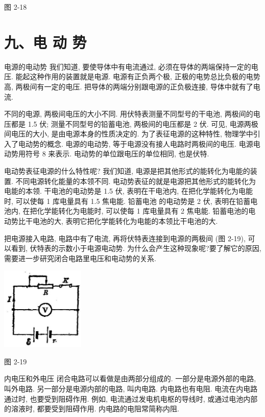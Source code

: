 \documentclass[10pt]{article}
\begin{document}
图 2-18

\section*{九、电 动 势}

电源的电动势 我们知道, 要使导体中有电流通过, 必须在导体的两端保持一定的电压. 能起这种作用的装置就是电源. 电源有正负两个极, 正极的电势总比负极的电势高, 两极间有一定的电压. 把导体的两端分别跟电源的正负极连接, 导体中就有了电流.

不同的电源, 两极间电压的大小不同. 用伏特表测量不同型号的干电池, 两极间的电压都是 1.5 伏; 测量不同型号的铅蓄电池, 两极间的电压都是 2 伏. 可见, 电源两极间电压的大小, 是由电源本身的性质决定的. 为了表征电源的这种特性, 物理学中引入了电动势的概念. 电源的电动势, 等于电源没有接人电路时两极间的电压. 电源电动势用符号 8 来表示. 电动势的单位跟电压的单位相同, 也是伏特.

电动势表征电源的什么特性呢? 我们知道, 电源是把其他形式的能转化为电能的装置. 不同电源转化能量的本领不同. 电动势表征的就是电源把其他形式的能转化为电能的本领. 干电池的电动势是 1.5 伏, 表明在干电池内, 在把化学能转化为电能时, 可以使每 1 库电量具有 1.5 焦电能. 铅蓄电池 的电动势是 2 伏, 表明在铅蓄电池内, 在把化学能转化为电能时, 可以使每 1 库电量具有 2 焦电能. 铅蓄电池的电动势比干电池的大, 表明它把化学能转化为电能的本领比干电池的大.

把电源接入电路, 电路中有了电流, 再将伏特表连接到电源的两极间 (图 2-19), 可以看到, 伏特表的示数小于电源电动势. 为什么会产生这种现象呢?要了解它的原因, 需要进一步研究闭合电路里电压和电动势的关系.

\begin{center}
\includegraphics[max width=0.3\textwidth]{images/01913056-1f15-74d8-9184-9aab52c9d66b_86_205200.jpg}
\end{center}

图 2-19

内电压和外电压 闭合电路可以看做是由两部分组成的. 一部分是电源外部的电路, 叫外电路. 另一部分是电源内部的电路, 叫内电路. 内电路也有电阻. 电流在内电路通过时, 也要受到阻碍作用. 例如, 电流通过发电机电枢的导线时, 或通过电池内部的溶液时, 都要受到阻碍作用. 内电路的电阻常简称内阻.
\end{document}
